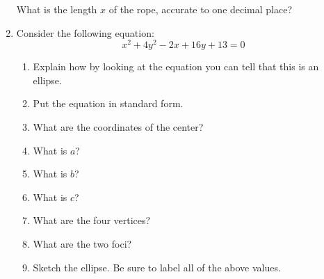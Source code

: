 \documentclass[letterpaper,12pt,fleqn]{article}
\begin{document}
\begin{enumerate}
  \begin{center}
  \end{center}

  What is the length $x$ of the rope, accurate to one decimal place?

  \vspace{3in}

\item Consider the following equation:
  \[x^2+4y^2-2x+16y+13=0\]
  \begin{enumerate}
  \item Explain how by looking at the equation you can tell that this is an
    ellipse.

    \vspace{2in}
    
  \item Put the equation in standard form.

    \vspace{4in}

  \item What are the coordinates of the center?

    \vspace{1in}
  
  \item What is $a$?

    \vspace{1in}
  
  \item What is $b$?

    \newpage
  
  \item What is $c$?

    \vspace{2in}
  
  \item What are the four vertices?

    \vspace {1in}
    
  \item What are the two foci?

    \vspace {1in}

  \item Sketch the ellipse. Be sure to label all of the above values.
  \end{enumerate}
\end{enumerate}
\end{document}
